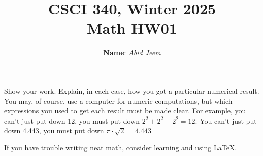\documentclass{article}
\begin{document}
\title{\bf CSCI 340, Winter 2025\\ Math HW01}
\author{\textbf{Name}: \textit{Abid Jeem}}
\date{}

\maketitle


Show your work.  Explain, in each case, how you got a particular
numerical result.  You may, of course, use a computer for numeric
computations, but which expressions you used to get each result must
be made clear.  For example, you can't just put down 12, you must put
down $2^2 + 2^2 + 2^2 = 12$.  You can't just put down 4.443, you
must put down $\pi\cdot\sqrt{2} = 4.443$

If you have trouble writing neat math, consider learning and using \LaTeX.
\end{document}
